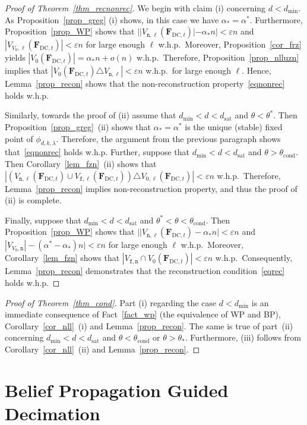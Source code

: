 \documentclass[10pt,reqno]{amsart}
\numberwithin{equation}{section}
\renewcommand{\vec}[1]{\boldsymbol{#1}}
\newcommand\dmin{d_{\mathrm{min}}}
\newcommand\dsat{d_{\mathrm{sat}}}
\newcommand{\FDC}[1]{\PHI_{\mathrm{DC},{#1}}}
\newcommand{\tcond}{\theta_{\mathrm{cond}}}
\newcommand{\frz}{V_0}
\newcommand{\frozen}{\mathtt{f}}
\newcommand{\nll}{\mathtt{n}}
\newcommand{\fzn}{\frozen}
\newcommand\PHI{\vec F}
\newcommand\eps{\varepsilon}
\newcommand{\whp}{w.h.p.}
\newcommand\Lem{Lemma}
\newcommand\Prop{Proposition}
\newcommand\Thm{Theorem}
\newcommand\Cor{Corollary}
\newcommand{\ph}{\phi_{d,k,\lambda}}
\begin{document}
\begin{proof}[Proof of \Thm~\ref{thm_recnonrec}]
	We begin with claim (i) concerning $d<\dmin$.
	As \Prop~\ref{prop_greg} (i) shows, in this case we have $\alpha_*=\alpha^*$.
	Furthermore, \Prop~\ref{prop_WP} shows that $||V_{\nll,\ell}(\FDC t)|-\alpha_*n|<\eps n$ and $|V_{\frz,\ell}(\FDC t)|<\eps n$ for large enough $\ell$ \whp\
	Moreover, \Prop~\ref{cor_frz} yields $|\frz(\FDC t)|=\alpha_*n+o(n)$ \whp\
	Therefore, \Prop~\ref{prop_nlluzn} implies that $|\frz(\FDC t)\triangle V_{\nll,\ell}|<\eps n$ \whp\ for large enough $\ell$.
	Hence, \Lem~\ref{prop_recon} shows that the non-reconstruction property~\eqref{eqnonrec} holds \whp\

	Similarly, towards the proof of (ii) assume that $\dmin<d<\dsat$ and $\theta<\theta^*$.
	Then \Prop~\ref{prop_greg}~(ii) shows that $\alpha_*=\alpha^*$ is the unique (stable) fixed point of $\ph$.
	Therefore, the argument from the previous paragraph shows that~\eqref{eqnonrec} holds \whp
	Further, suppose that $\dmin<d<\dsat$ and $\theta>\tcond$.
	Then \Cor~\ref{lem_fzn}~(ii) shows that $|(V_{\nll,\ell}(\FDC{t})\cup V_{\fzn,\ell}(\FDC{t}))\triangle V_{0,\ell}(\FDC{t})|<\eps n$ \whp\
	Therefore, \Lem~\ref{prop_recon} implies non-reconstruction property, and thus the proof of (ii) is complete.

	Finally, suppose that $\dmin<d<\dsat$ and $\theta^*<\theta<\tcond$.
	Then \Prop~\ref{prop_WP} shows that $||V_{\nll,\ell}(\FDC t)-\alpha_*n|<\eps n$ and $|V_{\frz,\nll}|-(\alpha^*-\alpha_*)n|<\eps n$ for large enough $\ell$ \whp\
	Moreover, \Cor~\ref{lem_fzn} shows that $|V_{\fzn,\nll}\cap\frz(\FDC t)|<\eps n$ \whp\
	Consequently, \Lem~\ref{prop_recon} demonstrates that the reconstruction condition~\eqref{eqrec} holds \whp
\end{proof}


\begin{proof}[Proof of \Thm~\ref{thm_cond}]
Part (i) regarding the case $d<\dmin$ is an immediate consequence of Fact~\ref{fact_wp} (the equivalence of WP and BP), \Cor~\ref{cor_nll}~(i) and \Lem~\ref{prop_recon}.
The same is true of part~(ii) concerning $\dmin<d<\dsat$ and $\theta<\tcond$ or $\theta>\theta_*$.
Furthermore, (iii) follows from \Cor~\ref{cor_nll}~(ii) and \Lem~\ref{prop_recon}.
\end{proof}

\section{Belief Propagation Guided Decimation}\label{sec_alg}
\end{document}
